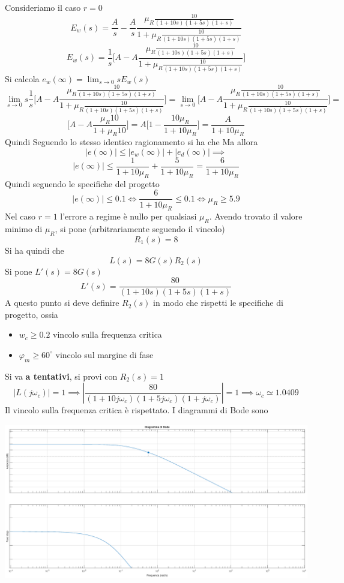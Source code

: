 \documentclass[10pt, letterpaper]{report}
\begin{document}
Consideriamo il caso $r=0$
$$ E_w(s)=\frac{A}{s}-\frac{A}{s}\frac{\mu_R\frac{10}{(1+10s)(1+5s)(1+s)}}{1+\mu_R\frac{10}{(1+10s)(1+5s)(1+s)}}$$
$$ E_w(s)=\frac{1}{s}\Big[A-A\frac{\mu_R\frac{10}{(1+10s)(1+5s)(1+s)}}{1+\mu_R\frac{10}{(1+10s)(1+5s)(1+s)}}\Big]$$
Si calcola $\displaystyle e_w(\infty)=\lim_{s\rightarrow 0}sE_w(s)$
$$ \lim_{s\rightarrow 0}s\frac{1}{s}\Big[A-A\frac{\mu_R\frac{10}{(1+10s)(1+5s)(1+s)}}{1+\mu_R\frac{10}{(1+10s)(1+5s)(1+s)}}\Big]=\lim_{s\rightarrow 0}\Big[A-A\frac{\mu_R\frac{10}{(1+10s)(1+5s)(1+s)}}{1+\mu_R\frac{10}{(1+10s)(1+5s)(1+s)}}\Big]=$$
$$ \Big[A-A\frac{\mu_R{10}}{1+\mu_R{10}}\Big]=A\Big[1-\frac{10\mu_R}{1+10\mu_R}\Big]=
\frac{A}{1+10\mu_R}$$
Quindi
Seguendo lo stesso identico ragionamento si ha che 
Ma allora 
$$ |e(\infty)|\le |e_w(\infty)|+ |e_d(\infty)|\implies $$
$$ |e(\infty)|\le \dfrac{1}{1+10\mu_R}+\dfrac{5}{1+10\mu_R}=\dfrac{6}{1+10\mu_R}$$
Quindi seguendo le specifiche del progetto 
$$ |e(\infty)|\le0.1\iff \dfrac{6}{1+10\mu_R}\le 0.1 \iff \mu_R\ge 5.9$$
Nel caso $r=1$ l'errore a regime è nullo per qualsiasi $\mu_R$. Avendo trovato il valore minimo di $\mu_R$, si pone (arbitrariamente seguendo il vincolo)
$$ R_1(s)=8$$
Si ha quindi che 
$$ L(s)=8G(s)R_2(s)$$
Si pone $L'(s)=8G(s)$
$$ L'(s)=\frac{80}{(1+10s)(1+5s)(1+s)}$$
A questo punto si deve definire $R_2(s)$ in modo che rispetti le specifiche di progetto, ossia\begin{itemize}
    \item $w_c\ge 0.2$ vincolo sulla frequenza critica 
    \item $\varphi_m\ge 60^\circ$ vincolo sul margine di fase
\end{itemize}
Si va \textbf{a tentativi}, si provi con $R_2(s)=1$
$$ |L(j\omega_c)|=1\implies |\frac{80}{(1+10j\omega_c)(1+5j\omega_c)(1+j\omega_c)}|=1\implies \omega_c\simeq 1.0409$$
Il vincolo sulla frequenza critica è rispettato. I diagrammi di Bode sono
\begin{center}
    \includegraphics[width=1\textwidth ]{images/EsercizioControlloreBode.eps}
\end{center}
\end{document}
